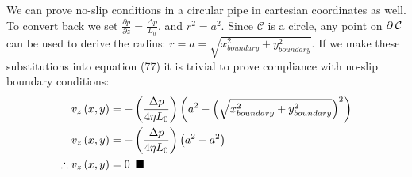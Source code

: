 \documentclass[titlepage]{article}
\begin{document}
\noindent We can prove no-slip conditions in a circular pipe in  cartesian coordinates as well. To convert back we set $\displaystyle\frac{\partial{p}}{\partial{z}}=\displaystyle\frac{\Delta{p}}{L_{0}}$, and $r^2=a^2$. Since $\mathcal{C}$ is a circle, any point on $\partial\hspace*{2pt}\mathcal{C}$ can be used to derive the radius: 
$r=a=\sqrt{x_{boundary}^2+y_{boundary}^2}$. If we make these substitutions into equation (77) it is trivial to prove compliance with no-slip boundary conditions:
\begin{align}
    v_{z}\left(x,y\right) &= -\left(\displaystyle\frac{\Delta{p}}{4\eta{L_{0}}}\right)\left(a^2-\left(\sqrt{x_{boundary}^2+y_{boundary}^2}\right)^2\right) \\
    v_{z}\left(x,y\right) &= -\left(\displaystyle\frac{\Delta{p}}{4\eta{L_{0}}}\right)\left(a^2-a^2\right) \\
    \therefore v_{z}\left(x,y\right) &= 0 \hspace*{5pt}\blacksquare
\end{align}

\newpage
\end{document}
